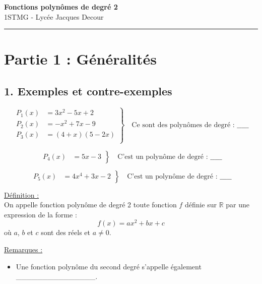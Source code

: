 \documentclass[12pt]{article}
\begin{document}
\begin{center}
    {\LARGE \textbf{Fonctions polynômes de degré 2}}\\[4mm]
    {\large 1STMG - Lycée Jacques Decour}
\end{center}

\hrule
\vspace{0.4cm}


\section*{Partie 1 : Généralités}

\subsection*{1. Exemples et contre-exemples}

\[
\left.
\begin{aligned}
P_1(x) &= 3x^2 - 5x + 2 \\
P_2(x) &= -x^2 + 7x - 9 \\
P_3(x) &= (4+x)(5-2x) \\
\end{aligned}
\right\}
\quad
\text{Ce sont des polynômes de degré : }\_\_\_\_\_
\]

\[
\left.
\begin{aligned}
P_4(x) &= 5x - 3
\end{aligned}
\right\}
\quad
\text{C'est un polynôme de degré : }\_\_\_\_\_
\]

\[
\left.
\begin{aligned}
P_5(x) &= 4x^4 + 3x -2
\end{aligned}
\right\}
\quad
\text{C'est un polynôme de degré : }\_\_\_\_\_
\]

\vspace{10pt}

\begin{mdframed}[
    linewidth=1pt,
    roundcorner=5pt,
    linecolor=ForestGreen
]
{\color{ForestGreen}\underline{Définition :}}
    \\On appelle fonction polynôme de degré 2 toute fonction $f$ définie sur $\mathbb{R}$ par une expression de la forme :
\[
    f(x) = ax^2 + bx + c
\]
où $a$, $b$ et $c$ sont des réels et $a \neq 0$.
\end{mdframed}

\underline{Remarques :}
\vspace{5pt}
\begin{itemize}
    \item Une fonction polynôme du second degré s'appelle également \_\_\_\_\_\_\_\_\_\_\_\_\_\_\_.
\end{itemize}
\end{document}
